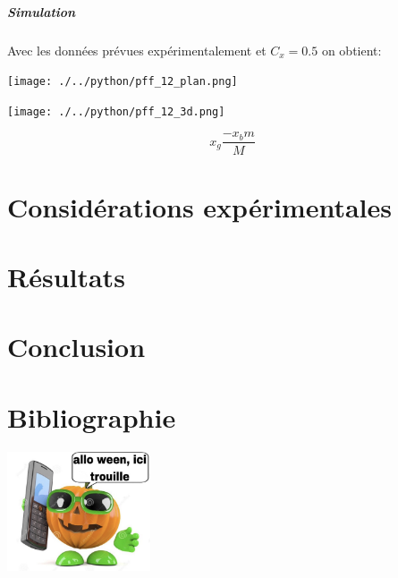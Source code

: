\documentclass{article}
\begin{document}
	\subsubsection{Simulation}
	Avec les données prévues expérimentalement et $C_x = 0.5$ on obtient:

	\begin{minipage}[t]{0.5\textwidth} 
		\centering 
		\texttt{[image: ./../python/pff\_12\_plan.png]}
	\end{minipage}
	\hfill 
	\begin{minipage}[t]{0.5\textwidth}
		\centering 
		\texttt{[image: ./../python/pff\_12\_3d.png]}
	\end{minipage}
	
	
	$$ x_g  \frac{-x_bm}{M}$$
	
	\renewcommand{\partname}{Partie}
	\part{Considérations expérimentales}
	\renewcommand{\partname}{Partie}
	\part{Résultats}
	\renewcommand{\partname}{Partie}
	\part{Conclusion}
	\renewcommand{\partname}{Partie}
	\part{Bibliographie}
	
	\centering 
	\includegraphics[width=160px]{./../autre/allo.png}
	
\end{document}
